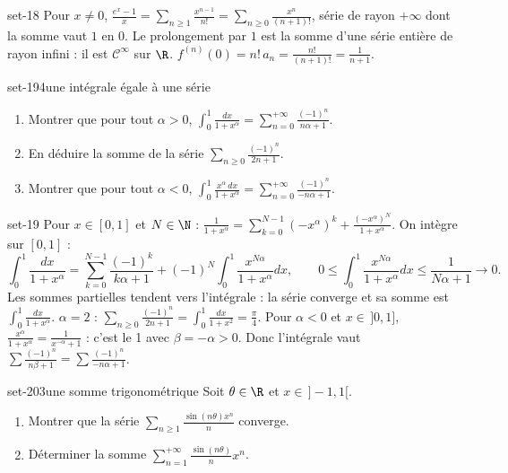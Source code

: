 \begin{corrige}{set-18}
 Pour $x\neq0$, $\frac{e^x-1}x=\sum_{n\geq1}\frac{x^{n-1}}{n!}=\sum_{n\geq0}\frac{x^n}{(n+1)!}$, série de rayon $+\infty$ dont la somme vaut $1$ en $0$. Le
prolongement par $1$ est la somme d'une série entière de rayon infini : il est $\mathcal C^\infty$ sur $\R$.
 $f^{(n)}(0)=n!\,a_n=\frac{n!}{(n+1)!}=\frac1{n+1}$.
\end{corrige}

\begin{exo}{set-19}{4}{une intégrale égale à une série}
\begin{enumerate}
\item Montrer que pour tout $\alpha>0$, $\displaystyle\int_0^1\frac{dx}{1+x^\alpha}=\sum_{n=0}^{+\infty}\frac{(-1)^n}{n\alpha+1}$.
\item En déduire la somme de la série $\sum_{n\geq0}\frac{(-1)^n}{2n+1}$.
\item Montrer que pour tout $\alpha<0$, $\displaystyle\int_0^1\frac{x^\alpha\,dx}{1+x^\alpha}=\sum_{n=0}^{+\infty}\frac{(-1)^n}{-n\alpha+1}$.
\end{enumerate}
\end{exo}

\begin{corrige}{set-19}
 Pour $x\in[0,1]$ et $N\in\N$ : $\frac1{1+x^\alpha}=\sum_{k=0}^{N-1}(-x^\alpha)^k+\frac{(-x^\alpha)^N}{1+x^\alpha}$. On intègre sur $[0,1]$ :
\[\int_0^1\frac{dx}{1+x^\alpha}=\sum_{k=0}^{N-1}\frac{(-1)^k}{k\alpha+1}+(-1)^N\int_0^1\frac{x^{N\alpha}}{1+x^\alpha}dx,\qquad0\leq\int_0^1\frac{x^{N\alpha}}{1+x^\alpha}dx\leq\frac1{N\alpha+1}\to0.\]
Les sommes partielles tendent vers l'intégrale : la série converge et sa somme est $\int_0^1\frac{dx}{1+x^\alpha}$.
 $\alpha=2$ : $\sum_{n\geq0}\frac{(-1)^n}{2n+1}=\int_0^1\frac{dx}{1+x^2}=\frac\pi4$.
 Pour $\alpha<0$ et $x\in\,]0,1]$, $\frac{x^\alpha}{1+x^\alpha}=\frac1{x^{-\alpha}+1}$ : c'est le 1 avec $\beta=-\alpha>0$. Donc l'intégrale vaut
$\sum\frac{(-1)^n}{n\beta+1}=\sum\frac{(-1)^n}{-n\alpha+1}$.
\end{corrige}

\begin{exo}{set-20}{3}{une somme trigonométrique}
Soit $\theta\in\R$ et $x\in\,]-1,1[$.
\begin{enumerate}
\item Montrer que la série $\sum_{n\geq1}\frac{\sin(n\theta)x^n}n$ converge.
\item Déterminer la somme $\sum_{n=1}^{+\infty}\frac{\sin(n\theta)}nx^n$.
\end{enumerate}
\end{exo}

